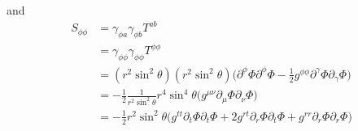 \documentclass[12pt]{article}
\numberwithin{equation}{section}
\begin{document}
and
\begin{equation}
\begin{aligned}
S_{\phi \phi} &= \gamma_{\phi a} \gamma_{\phi b} T^{ab} \\
&= \gamma_{\phi \phi} \gamma_{\phi \phi} T^{\phi \phi} \\
&= (r^2 \sin^2 \theta) (r^2 \sin^2 \theta) \Big( \partial^\phi \Phi \partial^\phi \Phi - \frac{1}{2} g^{\phi \phi} \partial^\gamma \Phi \partial_\gamma \Phi  \Big) \\
&= - \frac{1}{2} \frac{1}{r^2 \sin^2 \theta} r^4 \sin^4 \theta \Big( g^{\mu \nu} \partial_\mu \Phi \partial_\nu \Phi  \Big) \\
&= - \frac{1}{2} r^2 \sin^2 \theta \Big( g^{t t} \partial_t \Phi \partial_t \Phi + 2 g^{r t} \partial_r \Phi \partial_t \Phi + g^{r r} \partial_r \Phi \partial_r \Phi \Big) \\
\end{aligned}
\end{equation}
\end{document}
